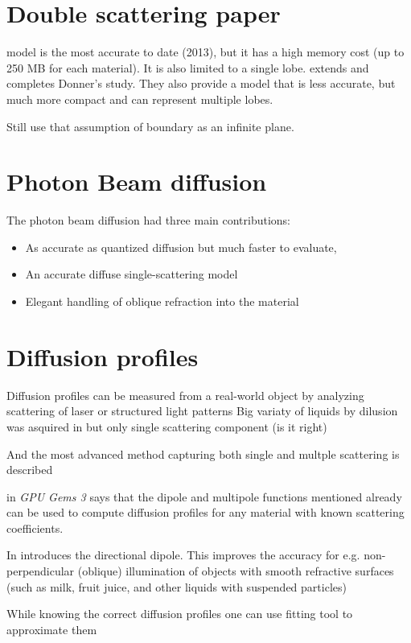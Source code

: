 \section{Double scattering paper}
\cite{Donner:2009:EBM} model is the most accurate to date (2013), but it has a
high memory cost (up to 250 MB for each material). It is also limited to a
single lobe. \cite{holzschuch:hal-00760054} extends and completes Donner's
study. They also provide a model that is less accurate, but much more compact
and can represent multiple lobes.

Still use that assumption of boundary as an infinite plane.

\section{Photon Beam diffusion}
The photon beam diffusion \cite{Habel:2013:PBD:2600890.2600896} had three main
contributions:
\begin{itemize}
    \item As accurate as quantized diffusion but much faster to evaluate,
    \item An accurate diffuse single-scattering model
    \item Elegant handling of oblique refraction into the material
\end{itemize}

\section{Diffusion profiles}
\begin{itemize}
    \item{Diffusion profiles can be measured from a real-world object by
    analyzing scattering of laser \cite{Jensen:2001:PMS:383259.383319} or
    structured light patterns \cite{tariq_efficient_2006-1} Big variaty of
    liquids by dilusion was asquired in
    \cite{Narasimhan:2006:ASP:1141911.1141986} but only single scattering
    component (is it right)
    \item{And the most advanced method capturing both single and multple
    scattering is described \cite{Gkioulekas:2013:IVR:2508363.2508377}}}
    \item{\cite{Nguyen:2007:GG:1407436} in \textit{GPU Gems 3} says that the
    dipole and multipole functions mentioned already can be used to compute
    diffusion profiles for any material with known scattering coefficients.
    \item{In \cite{Frisvad:2014:DDM:2702692.2682629} introduces the directional
    dipole}. This improves the accuracy for e.g. non-perpendicular (oblique)
    illumination of objects with smooth refractive surfaces (such as milk, fruit
    juice, and other liquids with suspended particles) }
    \item{While knowing the correct diffusion profiles one can use fitting tool
    to approximate them \cite{Nguyen:2007:GG:1407436}}
\end{itemize}
